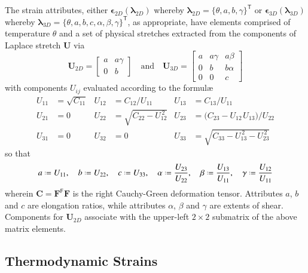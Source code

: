 The strain attributes, either $\boldsymbol{\epsilon}_{2D} ( \boldsymbol{\lambda}_{2D} )$ whereby $\boldsymbol{\lambda}_{2D} = \{ \theta , a , b , \gamma \}^{\mathsf{T}}$ or $\boldsymbol{\epsilon}_{3D} ( \boldsymbol{\lambda}_{3D} )$ whereby $\boldsymbol{\lambda}_{3D} = \{ \theta , a , b , c , \alpha , \beta , \gamma \}^{\mathsf{T}}$, as appropriate, have elements comprised of temperature $\theta$ and a set of physical stretches extracted from the components of Laplace stretch $\boldsymbol{U}$ via
\begin{equation}
\boldsymbol{U}_{2D} = 
\begin{bmatrix} 
a & a \gamma \\ 0 & b 
\end{bmatrix}
\quad \text{and} \quad 
\boldsymbol{U}_{3D} = 
\begin{bmatrix}
a & a \gamma & a \beta \\ 0 & b & b \alpha \\ 0 & 0 & c
\end{bmatrix}
\label{LaplaceStretch}
\end{equation}
with components $U_{ij}$ evaluated according to the formul\ae\
\begin{equation}
\begin{aligned}
U_{11} & = \sqrt{C_{11}} & 
U_{12} & = C_{12} / U_{11} &
U_{13} & = C_{13} / U_{11} \\
U_{21} & = 0 &
U_{22} & = \sqrt{C_{22} - U_{12}^{\,2}} &
U_{23} & = \bigl( C_{23} - U_{12\,}U_{13} \bigr) / U_{22} \\
U_{31} & = 0 &
U_{32} & = 0 & 
U_{33} & = \sqrt{C_{33} - U_{13}^{\,2} - U_{23}^{\,2}}
\end{aligned}
\label{LagrangianLaplaceStretch}
\end{equation}
so that
\begin{equation}
a \defeq U_{11} , \quad
b \defeq U_{22} , \quad
c \defeq U_{33} , \quad
\alpha \defeq \frac{U_{23}}{U_{22}} , \quad
\beta \defeq \frac{U_{13}}{U_{11}} , \quad
\gamma \defeq \frac{U_{12}}{U_{11}}
\label{LagrangianPhysicalAttributes}
\end{equation}
wherein $\mathbf{C} = \mathbf{F}^{\mathsf{F}} \mathbf{F}$ is the right Cauchy-Green deformation tensor.  Attributes $a$, $b$ and $c$ are elongation ratios, while attributes $\alpha$, $\beta$ and $\gamma$ are extents of shear. Components for $\boldsymbol{U}_{2D}$ associate with the upper-left $2 \! \times \! 2$ submatrix of the above matrix elements. 

\subsection{Thermodynamic Strains}


